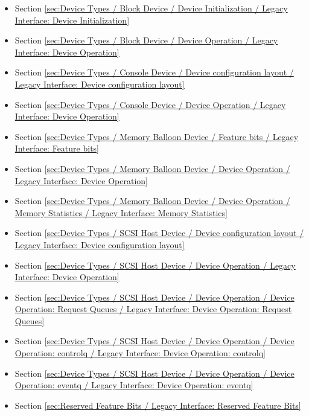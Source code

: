 \begin{itemize}
\item Section \ref{sec:Device Types / Block Device / Device Initialization / Legacy Interface: Device Initialization}
\item Section \ref{sec:Device Types / Block Device / Device Operation / Legacy Interface: Device Operation}
\item Section \ref{sec:Device Types / Console Device / Device configuration layout / Legacy Interface: Device configuration layout}
\item Section \ref{sec:Device Types / Console Device / Device Operation / Legacy Interface: Device Operation}
\item Section \ref{sec:Device Types / Memory Balloon Device / Feature bits / Legacy Interface: Feature bits}
\item Section \ref{sec:Device Types / Memory Balloon Device / Device Operation / Legacy Interface: Device Operation}
\item Section \ref{sec:Device Types / Memory Balloon Device / Device Operation / Memory Statistics / Legacy Interface: Memory Statistics}
\item Section \ref{sec:Device Types / SCSI Host Device / Device configuration layout / Legacy Interface: Device configuration layout}
\item Section \ref{sec:Device Types / SCSI Host Device / Device Operation / Legacy Interface: Device Operation}
\item Section \ref{sec:Device Types / SCSI Host Device / Device Operation / Device Operation: Request Queues / Legacy Interface: Device Operation: Request Queues}
\item Section \ref{sec:Device Types / SCSI Host Device / Device Operation / Device Operation: controlq / Legacy Interface: Device Operation: controlq}
\item Section \ref{sec:Device Types / SCSI Host Device / Device Operation / Device Operation: eventq / Legacy Interface: Device Operation: eventq}
\item Section \ref{sec:Reserved Feature Bits / Legacy Interface: Reserved Feature Bits}
\end{itemize}
